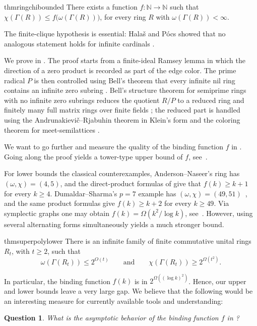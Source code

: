 \documentclass[a4paper,11pt]{amsart}
\newtheorem{ques}[ques]{Question}
\theoremstyle{definition}
\begin{document}
\begin{restatable}{thm}{ringchibounded}\label{thm:ring-chi-bounded}
There exists a function $f:\mathbb N\to\mathbb N$ such that $\chi(\Gamma(R))\le f\bigl(\omega(\Gamma(R))\bigr)$, for every
 ring $R$ with $\omega(\Gamma(R))<\infty$.
\end{restatable}
The finite-clique hypothesis is
essential: Hala\v{s} and P\'ocs showed that no analogous statement holds for
infinite cardinals \cite{HP24}. 

We prove  in .  The proof
starts from a finite-ideal Ramsey lemma in which the direction of a zero
product is recorded as part of the edge color.  The prime radical $P$ is then
controlled using Bell's theorem that every infinite nil ring contains an
infinite zero subring \cite{Bell01}.  Bell's structure theorem for semiprime
rings with no infinite zero subrings reduces the quotient $R/P$ to a reduced ring
and finitely many full matrix rings over finite fields \cite{Bell01}; the
reduced part is handled using the Andrunakievi\v{c}--Rjabuhin theorem in
Klein's form \cite{Klein80} and the coloring theorem for meet-semilattices
\cite{NWD07}.  

We want to go further and measure the quality of the binding function $f$ in . 
Going along the proof yields a tower-type upper bound of $f$, see~.

For lower bounds the classical counterexamples, Anderson--Naseer's ring
has $(\omega,\chi)=(4,5)$, and the direct-product
formulas of \cite{Kav22} give that $f(k)\ge k+1$ for every $k\ge4$.
Dumaldar--Sharma's $p=7$ example has $(\omega,\chi)=(49,51)$~\cite{DS98,TLW20}, and the same product formulas give
$f(k)\ge k+2$ for every $k\ge49$.  
Via symplectic graphs one may obtain 
$f(k)=\Omega(k^2/\log k)$, 
see~\cite{GodsilRoyle01,TW06}. However, using several alternating forms
simultaneously yields a much stronger bound.

\begin{restatable}{thm}{superpolylower}\label{thm:superpoly-lower}
There is an infinite family of finite commutative unital rings $R_t$, with $t\geq 2$, such that 
\[ 
\omega(\Gamma(R_t))\leq 2^{O(t)}\qquad \text{and} \qquad \chi(\Gamma(R_t))\geq 2^{\Omega(t^2)}.\]
\end{restatable}

In particular, the binding function $f(k)$ is in $2^{\Omega((\log k)^2)}$. Hence, our upper and lower bounds leave a very large gap. We believe that the following would be an interesting measure for currently available tools and understanding:
\begin{ques}
    What is the asymptotic behavior of the binding function $f$ in ?
\end{ques}
\end{document}
